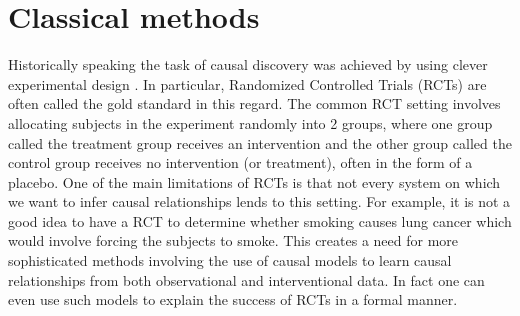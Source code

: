 \documentclass{tufte-book}
\begin{document}
\section{Classical methods}
\label{sec:org0862245}
Historically speaking the task of causal discovery was achieved by using clever experimental design \cite{fisher-1935}. In particular, Randomized Controlled Trials (RCTs) are often called the gold standard in this regard. The common RCT setting involves allocating subjects in the experiment randomly into 2 groups, where one group called the treatment group receives an intervention and the other group called the control group receives no intervention (or treatment), often in the form of a placebo. One of the main limitations of RCTs is that not every system on which we want to infer causal relationships lends to this setting. For example, it is not a good idea to have a RCT to determine whether smoking causes lung cancer which would involve forcing the subjects to smoke. This creates a need for more sophisticated methods involving the use of causal models to learn causal relationships from both observational and interventional data. In fact one can even use such models to explain the success of RCTs in a formal manner.
\end{document}
